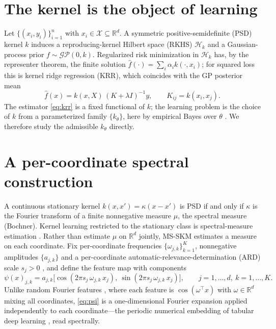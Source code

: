 \documentclass[11pt]{article}
\theoremstyle{definition}
\newcommand{\R}{\mathbb{R}}
\newcommand{\X}{\mathcal{X}}
\newcommand{\Hk}{\mathcal{H}}
\begin{document}
\section{The kernel is the object of learning}\label{sec:setup}
Let $\{(x_i,y_i)\}_{i=1}^n$ with $x_i\in\X\subseteq\R^d$. A symmetric positive-semidefinite
(PSD) kernel $k$ induces a reproducing-kernel Hilbert space (RKHS) $\Hk_k$ and a Gaussian-process
prior $f\sim\mathcal{GP}(0,k)$. Regularized risk minimization in $\Hk_k$ has, by the representer
theorem, the finite solution $\hat f(\cdot)=\sum_i\alpha_i k(\cdot,x_i)$; for squared loss this
is kernel ridge regression (KRR), which coincides with the GP posterior mean
\begin{equation}
\hat f(x)=k(x,X)\,(K+\lambda I)^{-1}y,\qquad K_{ij}=k(x_i,x_j).
\label{eq:krr}
\end{equation}
The estimator \eqref{eq:krr} is a fixed functional of $k$; the learning problem is the choice
of $k$ from a parameterized family $\{k_\theta\}$, here by empirical Bayes over $\theta$
\citep{rw2006}. We therefore study the admissible $k_\theta$ directly.

\section{A per-coordinate spectral construction}\label{sec:spectral}
A continuous stationary kernel $k(x,x')=\kappa(x-x')$ is PSD if and only if $\kappa$ is the
Fourier transform of a finite nonnegative measure $\mu$, the spectral measure (Bochner). Kernel
learning restricted to the stationary class is spectral-measure estimation \citep{wilson2013}.
Rather than estimate $\mu$ on $\R^d$ jointly, MS-SKM estimates a measure on each coordinate.
Fix per-coordinate frequencies $\{\omega_{j,k}\}_{k=1}^K$, nonnegative amplitudes $\{a_{j,k}\}$
and a per-coordinate automatic-relevance-determination (ARD) scale $s_j>0$
\citep{neal1996,mackay1996,rw2006}, and define the feature map with components
\begin{equation}
\psi(x)_{j,k}=a_{j,k}\big[\cos(2\pi s_j\,\omega_{j,k}\,x_j),\ \sin(2\pi s_j\,\omega_{j,k}\,x_j)\big],
\qquad j=1,\dots,d,\ k=1,\dots,K.
\label{eq:psi}
\end{equation}
Unlike random Fourier features \citep{rahimi2007}, where each feature is $\cos(\omega^\top x)$
with $\omega\in\R^d$ mixing all coordinates, \eqref{eq:psi} is a one-dimensional Fourier
expansion applied independently to each coordinate---the periodic numerical embedding of
tabular deep learning \citep{gorishniy2022,ye2024}, read spectrally.
\end{document}

